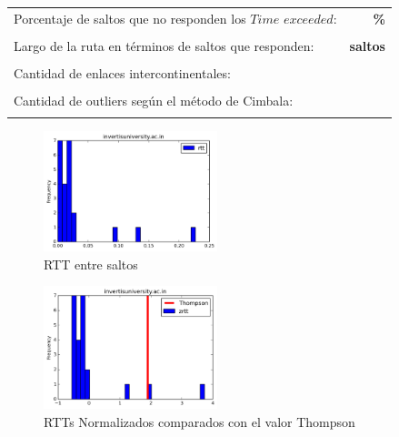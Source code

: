 \begin{center}
\begin{tabular}{p{6.5cm}r}
Porcentaje de saltos que no responden los $Time$ $exceeded$: & \textbf{\%} \\ \\ 
Largo de la ruta en términos de saltos que responden: &\textbf{ saltos} \\ \\
Cantidad de enlaces intercontinentales: & \textbf{} \\ \\
Cantidad de outliers según el método de Cimbala: & \textbf{} \\ \\
\end{tabular}
\end{center}

\begin{figure}[H]
  \centering
    \includegraphics[width=0.45\textwidth]{histogramas_rtt/invertisuniversity-ac-in.png}
  \caption{RTT entre saltos}
  \label{entropia-s}
\end{figure}

\begin{center}

\end{center}

\begin{figure}[H]
  \centering
    \includegraphics[width=0.45\textwidth]{histogramas_thompson/invertisuniversity-ac-in.png}
  \caption{RTTs Normalizados comparados con el valor Thompson}
  \label{entropia-s}
\end{figure}

